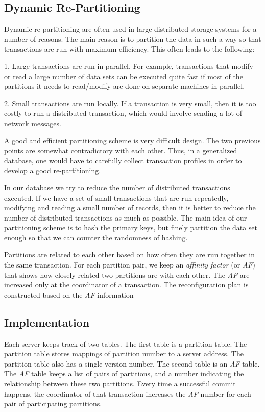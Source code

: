 \documentclass[a4paper, 10pt, notitlepage]{report}
\begin{document}
\subsection*{Dynamic Re-Partitioning}

Dynamic re-partitioning are often used in large distributed storage systems for a number of reasons. The main reason is
to partition the data in such a way so that transactions are run with maximum efficiency. This often leads to the following:

1. Large transactions are run in parallel. For example, transactions that modify or read a large number of data sets
can be executed quite fast if most of the partitions it needs to read/modify are done on separate machines in parallel.

2. Small transactions are run locally. If a transaction is very small, then it is too costly to run a distributed transaction,
which would involve sending a lot of network messages. 

A good and efficient partitioning scheme is very difficult design. The two previous points are somewhat contradictory with each
other. Thus, in a generalized database, one would have to carefully collect transaction profiles in order to develop a good
re-partitioning.

In our database we try to reduce the number of distributed transactions executed. If we have a set of small transactions that are 
run repeatedly, modifying and reading a small number of records, then it is better to reduce the number of distributed transactions 
as much as possible. The main idea of our partitioning scheme is to hash the primary keys, but finely partition the data set enough 
so that we can counter the randomness of hashing. 

Partitions are related to each other based on how often they are run together in the same transaction. For each partition pair, we
keep an {\em affinity factor} (or {\em AF}) that shows how closely related two partitions are with each other. The {\em AF} are
increased only at the coordinator of a transaction. The reconfiguration plan is constructed based on the {\em AF} information

\subsection*{Implementation}

Each server keeps track of two tables. The first table is a partition table. The partition table stores mappings of partition number
to a server address. The partition table also has a single version number. The second table is an {\em AF} table.
The {\em AF} table keeps a list of pairs of partitions, and a number indicating the relationship between these two partitions.
Every time a successful commit happens, the coordinator of that transaction increases the {\em AF} number for each pair of participating
partitions. 
\end{document}
